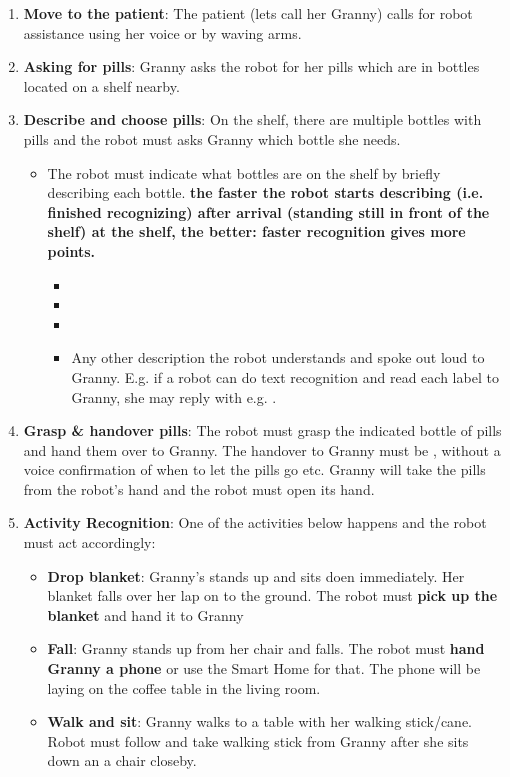 \begin{enumerate}
	\item \textbf{Move to the patient}: The patient (lets call her Granny) calls for robot assistance using her voice or by waving arms.
	\item \textbf{Asking for pills}: Granny asks the robot for her pills which are in bottles located on a shelf nearby. 
	\item \textbf{Describe and choose pills}: On the shelf, there are multiple bottles with pills and the robot must asks Granny which bottle she needs.
	\begin{itemize}
		\item The robot must indicate what bottles are on the shelf by briefly describing each bottle.
		\textbf{the faster the robot starts describing (i.e. finished recognizing) after arrival (standing still in front of the shelf) at the shelf, the better: faster recognition gives more points. }
		\begin{itemize}
 			\item {}
  			\item {}
  			\item {}
  			\item Any other description the robot understands and spoke out loud to Granny. E.g. if a robot can do text recognition and read each label to Granny, she may reply with e.g. .
 		\end{itemize}
 	\end{itemize}
 	\item \textbf{Grasp \& handover pills}: The robot must grasp the indicated bottle of pills and hand them over to Granny. The handover to Granny must be , without a voice confirmation of when to let the pills go etc. Granny will take the pills from the robot's hand and the robot must open its hand.
 	\item \textbf{Activity Recognition}: One of the activities below happens and the robot must act accordingly:
 	\begin{itemize}
 		\item \textbf{Drop blanket}: Granny's stands up and sits doen immediately. Her blanket falls over her lap on to the ground. The robot must \textbf{pick up the blanket} and hand it to Granny
 		\item \textbf{Fall}: Granny stands up from her chair and falls. The robot must \textbf{hand Granny a phone} or use the Smart Home for that. 
								The phone will be laying on the coffee table in the living room.
 		\item \textbf{Walk and sit}: Granny walks to a table with her walking stick/cane. Robot must follow and take walking stick from Granny after she sits down an a chair closeby.
 	\end{itemize}
\end{enumerate}


